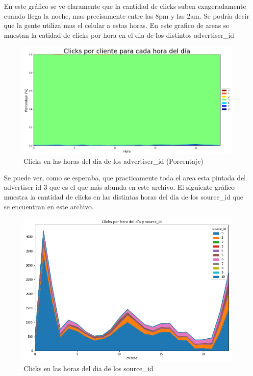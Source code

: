 \documentclass[a4paper, 12pt]{article}
\newcommand\tab[1][1cm]{\hspace*{#1}}
\begin{document}
		\tab En este gráfico se ve claramente que la cantidad de clicks suben exageradamente cuando llega la noche, mas precisamente entre las 8pm y las 2am. Se podría decir que la gente utiliza mas el celular a estas horas.
		\newline
		\newline
		\tab En este grafico de areas se muestan la catidad de clicks por hora en el dia de los distintos advertiser\_id
	
		\FloatBarrier
		\begin{figure}[h]
			\centering
			\includegraphics[scale=0.37]{images/clicks/clicks_advertiser_id_hours_persentage.png}
			\caption{Clicks en las horas del dia de los advertiser\_id (Porcentaje)}
		\end{figure}
		\FloatBarrier



		\tab Se puede ver, como se esperaba, que practicamente toda el area esta pintada del advertiser id 3 que es el que más abunda en este archivo.
		\newline
		\newline
		\tab El siguiente gráfico muestra la cantidad de clicks en las distintas horas del dia de los source\_id que se encuentran en este archivo.

		\FloatBarrier
		\begin{figure}[h]
			\centering
			\includegraphics[width=\textwidth]{images/clicks/clicks_source_id_hours.png}
			\caption{Clicks en las horas del dia de los source\_id}
		\end{figure}
		\FloatBarrier
\end{document}
